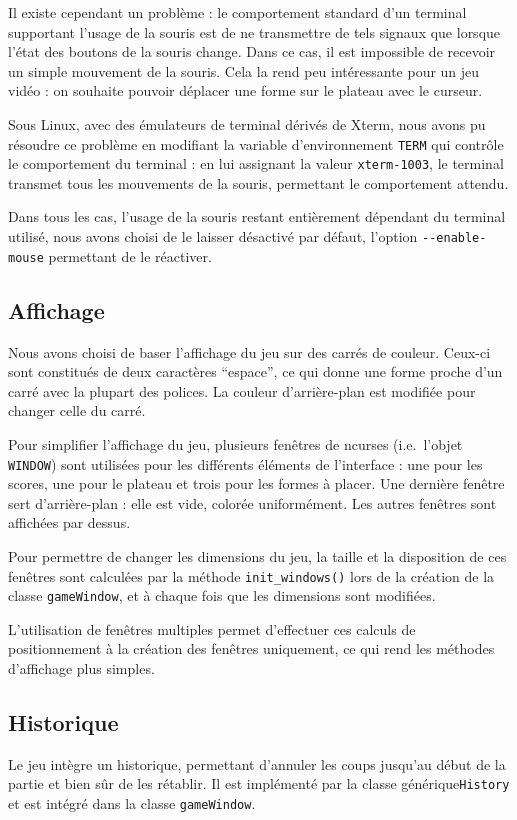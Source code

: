 \documentclass[11pt,a4paper]{article}
\begin{document}
Il existe cependant un problème : le comportement standard d'un terminal supportant l'usage de la souris est de ne transmettre de tels signaux que lorsque l'état des boutons de la souris change. Dans ce cas, il est impossible de recevoir un simple mouvement de la souris. Cela la rend peu intéressante pour un jeu vidéo : on souhaite pouvoir déplacer une forme sur le plateau avec le curseur.

Sous Linux, avec des émulateurs de terminal dérivés de Xterm, nous avons pu résoudre ce problème en modifiant la variable d'environnement \verb"TERM" qui contrôle le comportement du terminal : en lui assignant la valeur \verb"xterm-1003", le terminal transmet tous les mouvements de la souris, permettant le comportement attendu.

Dans tous les cas, l'usage de la souris restant entièrement dépendant du terminal utilisé, nous avons choisi de le laisser désactivé par défaut, l'option \verb"--enable-mouse" permettant de le réactiver.

\subsection{Affichage}
Nous avons choisi de baser l'affichage du jeu sur des carrés de couleur. Ceux-ci sont constitués de deux caractères ``espace'', ce qui donne une forme proche d'un carré avec la plupart des polices. La couleur d'arrière-plan est modifiée pour changer celle du carré.

Pour simplifier l'affichage du jeu, plusieurs fenêtres de ncurses (i.e.\ l'objet \verb"WINDOW") sont utilisées pour les différents éléments de l'interface : une pour les scores, une pour le plateau et trois pour les formes à placer. Une dernière fenêtre sert d'arrière-plan : elle est vide, colorée uniformément. Les autres fenêtres sont affichées par dessus.

Pour permettre de changer les dimensions du jeu, la taille et la disposition de ces fenêtres sont calculées par la méthode \verb"init_windows()" lors de la création de la classe \verb"gameWindow", et à chaque fois que les dimensions sont modifiées.

L'utilisation de fenêtres multiples permet d'effectuer ces calculs de positionnement à la création des fenêtres uniquement, ce qui rend les méthodes d'affichage plus simples.


\subsection{Historique}
Le jeu intègre un historique, permettant d'annuler les coups jusqu'au début de la partie et bien sûr de les rétablir. Il est implémenté par la classe générique\verb"History" et est intégré dans la classe \verb"gameWindow".
\end{document}
